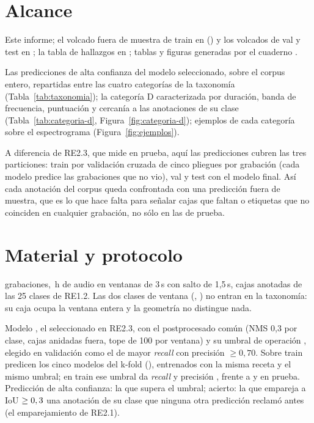 \documentclass[12pt,a4paper]{article}
\begin{document}

\section{Alcance}

 Este informe; el volcado fuera de muestra de train en
 () y los volcados de val y test en
; la tabla de hallazgos  en
; tablas y figuras generadas por el cuaderno
.

 Las predicciones de alta confianza del modelo seleccionado, sobre el
corpus entero, repartidas entre las cuatro categorías de la taxonomía
(Tabla~\ref{tab:taxonomia}); la categoría D caracterizada por duración, banda de frecuencia,
puntuación y cercanía a las anotaciones de su clase (Tabla~\ref{tab:categoria-d},
Figura~\ref{fig:categoria-d}); ejemplos de cada categoría sobre el espectrograma
(Figura~\ref{fig:ejemplos}).

 A diferencia de RE2.3, que mide en prueba, aquí las predicciones cubren
las tres particiones: train por validación cruzada de cinco pliegues por grabación (cada
modelo predice las grabaciones que no vio), val y test con el modelo final. Así cada
anotación del corpus queda confrontada con una predicción fuera de muestra, que es lo que
hace falta para señalar cajas que faltan o etiquetas que no coinciden en cualquier grabación,
no sólo en las de prueba.

\section{Material y protocolo}

 \nRecordings{} grabaciones, \hours{}\,h de audio en ventanas de 3\,s con
salto de 1,5\,s, \nAnnotated{} cajas anotadas de las 25 clases de RE1.2. Las dos clases de
ventana (, ) no entran en la taxonomía: su caja ocupa la ventana
entera y la geometría no distingue nada.

 Modelo \code{\run}, el seleccionado en RE2.3, con el postprocesado
común (NMS 0,3 por clase, cajas anidadas fuera, tope de 100 por ventana) y su umbral de
operación \threshold{}, elegido en validación como el de mayor \textit{recall} con precisión
$\geq 0{,}70$. Sobre train predicen los cinco modelos del k-fold
(), entrenados con la misma receta y el mismo umbral;
en train ese umbral da \textit{recall} \trainRecall{} y precisión \trainPrecision{}, frente a
\testRecall{} y \testPrecision{} en prueba. Predicción de alta confianza: la que supera el
umbral; acierto: la que empareja a IoU $\geq 0,3$ una anotación de su clase que ninguna
otra predicción reclamó antes (el emparejamiento de RE2.1). 
\end{document}
